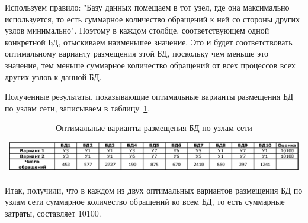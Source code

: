 Используем правило: "Базу данных помещаем в тот узел, где она максимально используется, то есть суммарное количество обращений к ней со стороны других узлов минимально". Поэтому в каждом столбце, соответствующем одной конкретной БД, отыскиваем наименьшее значение. Это и будет соответствовать оптимальному варианту размещения этой БД, поскольку чем меньше это значение, тем меньше суммарное количество обращений от всех процессов всех других узлов к данной БД.\par\bigskip

Полученные результаты, показывающие оптимальные варианты размещения БД по узлам сети, записываем в таблицу~\ref{table:optimum}.

\begin{table}[h]
\caption{Оптимальные варианты размещения БД по узлам сети}
\label{table:optimum}
 \begin{tabular}{c}
 \includegraphics[width=1\linewidth]{pics/pic8_5_optimum.eps}
 \end{tabular}
\end{table}

Итак, получили, что в каждом из двух оптимальных вариантов размещения БД по узлам сети суммарное количество обращений ко всем БД, то есть суммарные затраты, составляет 10100.
